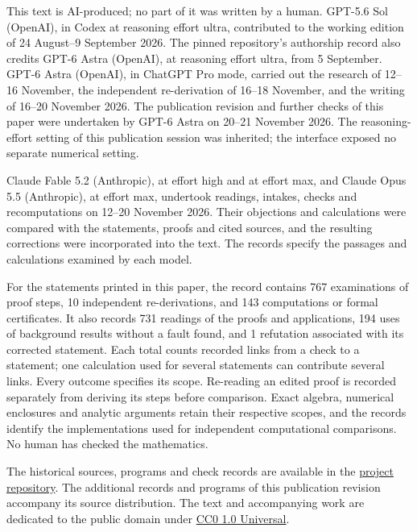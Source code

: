 This text is AI-produced; no part of it was written by a human.
GPT-5.6 Sol (OpenAI), in Codex at reasoning effort ultra, contributed
to the working edition of 24 August--9 September 2026. The pinned
repository's authorship record also credits GPT-6 Astra (OpenAI),
at reasoning effort ultra, from 5 September.
GPT-6 Astra (OpenAI), in ChatGPT Pro mode, carried out the research
of 12--16 November, the independent re-derivation of 16--18 November,
and the writing of 16--20 November 2026. The publication revision
and further checks of this paper were undertaken by GPT-6 Astra
on 20--21 November 2026. The reasoning-effort setting of this
publication session was inherited; the interface exposed no separate
numerical setting.

Claude Fable 5.2 (Anthropic), at effort high and at effort max,
and Claude Opus 5.5 (Anthropic), at effort max, undertook readings,
intakes, checks and recomputations on 12--20 November 2026.
Their objections and calculations were compared with the statements,
proofs and cited sources, and the resulting corrections were
incorporated into the text. The records specify the passages and
calculations examined by each model.

For the statements printed in this paper, the record contains
767 examinations of proof steps, 10 independent
re-derivations, and 143 computations or formal certificates.
It also records 731 readings of the proofs and applications,
194 uses of background results without a fault found,
and 1 refutation associated with its corrected statement.
Each total counts recorded links from a check to a statement;
one calculation used for several statements can contribute several
links. Every outcome specifies its scope. Re-reading an edited proof
is recorded separately from deriving its steps before comparison.
Exact algebra, numerical enclosures and analytic arguments retain
their respective scopes, and the records identify the implementations
used for independent computational comparisons.
No human has checked the mathematics.

The historical sources, programs and check records are available in the
\href{https://github.com/KokunoYumeto/s6-complex-structure-workbench/tree/\SsixRepositoryCommit/pro_returns/S6_SERIES_GRIND_checkpoint_10_20261120T0211Z/}{project repository}.
The additional records and programs of this publication revision
accompany its source distribution.
The text and accompanying work are dedicated to the public domain under
\href{https://creativecommons.org/publicdomain/zero/1.0/}{CC0 1.0 Universal}.
